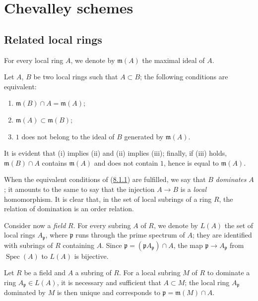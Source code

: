 \section{Chevalley schemes}
\label{section:I.8}

\subsection{Related local rings}
\label{subsection:I.8.1}

For every local ring $A$, we denote by $\mathfrak m(A)$ the maximal ideal of
$A$.

\begin{lemma}[8.1.1]
\label{I.8.1.1}
Let $A$, $B$ be two local rings such that $A\subset B$; the following
conditions are equivalent:
\begin{enumerate}
  \item[\textup{(i)}] $\mathfrak m(B)\cap A=\mathfrak m(A)$;
  \item[\textup{(ii)}] $\mathfrak m(A)\subset\mathfrak m(B)$;
  \item[\textup{(iii)}] $1$ does not belong to the ideal of $B$ generated by
    $\mathfrak m(A)$.
\end{enumerate}
\end{lemma}

It is evident that (i) implies (ii) and (ii) implies (iii); finally, if (iii)
holds, $\mathfrak m(B)\cap A$ contains $\mathfrak m(A)$ and does not contain
$1$, hence is equal to $\mathfrak m(A)$.

When the equivalent conditions of
(\hyperref[I.8.1.1]{8.1.1}) are fulfilled, we say that $B$ \emph{dominates}
$A$; it amounts to the same to say that the injection $A\to B$ is a
\emph{local} homomorphism. It is clear that, in the set of local subrings of a
ring $R$, the relation of domination is an order relation.

\begin{env}[8.1.2]
\label{I.8.1.2}
Consider now a \emph{field} $R$. For every subring $A$ of $R$, we denote by
$L(A)$ the set of local rings $A_\mathfrak p$, where $\mathfrak p$ runs
through the prime spectrum of $A$; they are identified with subrings of $R$
containing $A$. Since
$\mathfrak p=(\mathfrak p A_\mathfrak p)\cap A$, the map
$\mathfrak p\to A_\mathfrak p$ from $\operatorname{Spec}(A)$ to $L(A)$
is bijective.
\end{env}

\begin{lemma}[8.1.3]
\label{I.8.1.3}
Let $R$ be a field and $A$ a subring of $R$. For a local subring $M$ of $R$ to
dominate a ring $A_\mathfrak p\in L(A)$, it is necessary and sufficient that
$A\subset M$; the local ring $A_\mathfrak p$ dominated by $M$ is then unique
and corresponds to $\mathfrak p=\mathfrak m(M)\cap A$.
\end{lemma}

